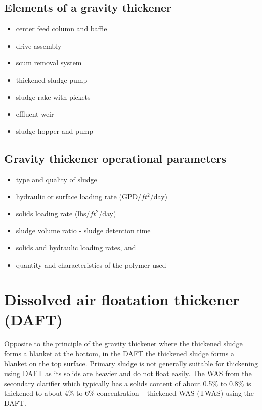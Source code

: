 \subsection{Elements of a gravity thickener}

\begin{itemize}
\item center feed column and baffle\\
\item drive assembly\\
\item scum removal system\\
\item thickened sludge pump\\
\item sludge rake with pickets\\
\item effluent weir\\
\item sludge hopper and pump\\
\end{itemize}

\subsection{Gravity thickener operational parameters}

\begin{itemize}
\item type and quality of sludge\\
\item hydraulic or surface loading rate (GPD/$ft^2$/day)\\
\item solids loading rate (lbs/$ft^2$/day)\\
\item sludge volume ratio - sludge detention time\\
\item solids and hydraulic loading rates, and\\
\item quantity and characteristics of the polymer used\\
\end{itemize}

\section{Dissolved air floatation thickener (DAFT)}
Opposite to the principle of the gravity thickener where the thickened sludge forms a blanket at the bottom, in the DAFT the thickened sludge forms a blanket on the top surface.  Primary sludge is not generally suitable for thickening using DAFT as its solids are heavier and do not float easily. The WAS from the secondary clarifier which typically has a solids content of about 0.5\% to 0.8\% is thickened to about 4\% to 6\% concentration – thickened WAS (TWAS) using the DAFT.

